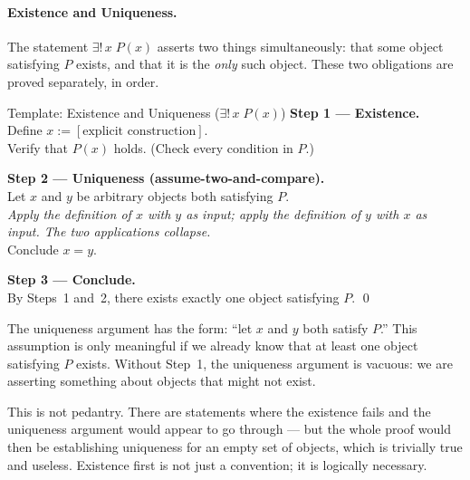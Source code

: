 \paragraph{Existence and Uniqueness.}

The statement $\exists!\, x\; P(x)$ asserts two things simultaneously:
that some object satisfying $P$ exists, and that it is the \emph{only}
such object. These two obligations are proved separately, in order.

\begin{propositionbox}{Template: Existence and Uniqueness ($\exists!\, x\; P(x)$)}
\textbf{Step 1 --- Existence.}\\
Define $x := [\text{explicit construction}]$.\\
Verify that $P(x)$ holds. (Check every condition in $P$.)

\medskip
\textbf{Step 2 --- Uniqueness (assume-two-and-compare).}\\
Let $x$ and $y$ be arbitrary objects both satisfying $P$.\\
\emph{Apply the definition of $x$ with $y$ as input; apply the definition
of $y$ with $x$ as input. The two applications collapse.}\\
Conclude $x = y$.

\medskip
\textbf{Step 3 --- Conclude.}\\
By Steps~1 and~2, there exists exactly one object satisfying $P$. \qed
\end{propositionbox}

\begin{remark}
The uniqueness argument has the form: ``let $x$ and $y$ both satisfy
$P$.'' This assumption is only meaningful if we already know that at
least one object satisfying $P$ exists. Without Step~1, the uniqueness
argument is vacuous: we are asserting something about objects that
might not exist.

This is not pedantry. There are statements where the existence fails
and the uniqueness argument would appear to go through --- but the
whole proof would then be establishing uniqueness for an empty set of
objects, which is trivially true and useless. Existence first is not
just a convention; it is logically necessary.
\end{remark}

